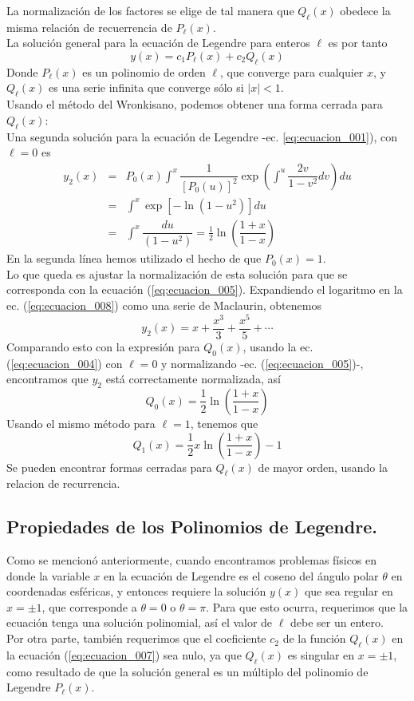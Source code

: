 La normalización de los factores se elige de tal manera que $Q_{\ell}(x)$ obedece la misma relación de recuerrencia de $P_{\ell}(x)$.
\\
La solución general para la ecuación de Legendre para enteros $\ell$ es por tanto
\begin{equation}
y(x) = c_{1} P_{\ell}(x) + c_{2} Q_{\ell} (x) 
\label{eq:ecuacion_007}
\end{equation}
Donde $P_{\ell}(x)$ es un polinomio de orden $\ell$, que converge para cualquier $x$, y $Q_{\ell}(x)$ es una serie infinita que converge sólo si $\vert x \vert < 1$.
\\
Usando el método del Wronkisano, podemos obtener una forma cerrada para $Q_{\ell}(x)$:
\\
Una segunda solución para la ecuación de Legendre -ec. \ref{eq:ecuacion_001}), con $\ell = 0$ es
\begin{eqnarray}
y_{2}(x) &=& P_{0}(x) \int^{x} \dfrac{1}{[P_{0}(u)]^{2}} \exp \left( \int^{u} \dfrac{2v}{1-v^{2}} dv \right) du \nonumber \\
&=& \int^{x} \exp [ - \ln (1 - u^{2}) ] du \nonumber \\
&=& \int^{x} \dfrac{du}{(1-u^{2})} = \frac{1}{2} \ln \left( \dfrac{1+x}{1-x} \right) \label{eq:ecuacion_008}
\end{eqnarray}
En la segunda línea hemos utilizado el hecho de que $P_{0}(x)=1$.
\\
Lo que queda es ajustar la normalización de esta solución para que se corresponda con la ecuación (\ref{eq:ecuacion_005}). Expandiendo el logaritmo en la ec. (\ref{eq:ecuacion_008}) como una serie de Maclaurin, obtenemos
\[ y_{2}(x) = x + \dfrac{x^{3}}{3} + \dfrac{x^{5}}{5} + \cdots \]
Comparando esto con la expresión para $Q_{0}(x)$, usando la ec. (\ref{eq:ecuacion_004}) con $\ell = 0$ y normalizando -ec. (\ref{eq:ecuacion_005})-, encontramos que $y_{2}$ está correctamente normalizada, así
\[ Q_{0} (x) = \dfrac{1}{2} \ln \left( \dfrac{1+x}{1-x} \right) \]
Usando el mismo método para $\ell = 1$, tenemos que
\[ Q_{1} (x) =  \frac{1}{2} x \ln \left( \dfrac{1+x}{1-x} \right) - 1 \]
Se pueden encontrar formas cerradas para $Q_{\ell}(x)$ de mayor orden, usando la relacion de recurrencia.
\subsection{Propiedades de los Polinomios de Legendre.}
Como se mencionó anteriormente, cuando encontramos problemas físicos en donde la variable $x$ en la ecuación de Legendre es el coseno del ángulo polar $\theta$ en coordenadas esféricas, y entonces requiere la solución $y(x)$ que sea regular en $x = \pm 1$, que corresponde a $\theta = 0$ o $\theta = \pi$. Para que esto ocurra, requerimos que la ecuación tenga una solución polinomial, así el valor de $\ell$ debe ser un entero.
\\
Por otra parte, también requerimos que el coeficiente $c_{2}$ de la función $Q_{\ell}(x)$ en la ecuación (\ref{eq:ecuacion_007}) sea nulo, ya que $Q_{\ell}(x)$ es singular en $x = \pm 1$, como resultado de que la solución general es un múltiplo del polinomio de Legendre $P_{\ell}(x)$.

